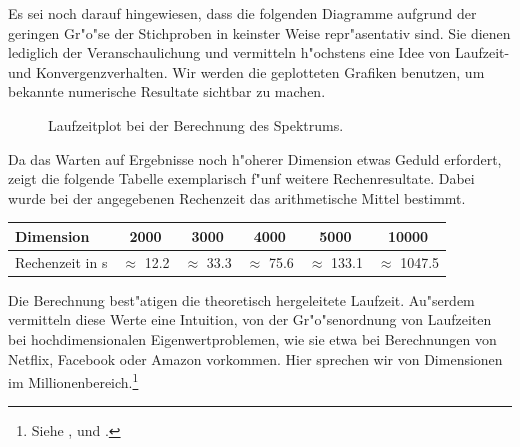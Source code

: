 Es sei noch darauf hingewiesen, dass die folgenden Diagramme aufgrund der geringen Gr"o"se der Stichproben in keinster Weise repr"asentativ sind. Sie dienen lediglich der Veranschaulichung und vermitteln h"ochstens eine Idee von Laufzeit- und Konvergenzverhalten. Wir werden die geplotteten Grafiken benutzen, um bekannte numerische Resultate sichtbar zu machen.

\newpage

\begin{figure}[h!]
\centering


\caption{Laufzeitplot bei der Berechnung des Spektrums.}\label{fig:chap5:laufzeit}
\end{figure}

Da das Warten auf Ergebnisse noch h"oherer Dimension etwas Geduld erfordert, zeigt die folgende Tabelle exemplarisch f"unf weitere Rechenresultate. Dabei wurde bei der angegebenen Rechenzeit das arithmetische Mittel bestimmt.

\begin{center}
\begin{tabular}{lccccc}
Dimension & 2000 & 3000 & 4000 & 5000 & 10000 \\
\hline
Rechenzeit in s & $\approx$ 12.2 & $\approx$ 33.3 & $\approx$ 75.6 & $\approx$ 133.1 & $\approx$ 1047.5
\end{tabular}
\end{center}

Die Berechnung best"atigen die theoretisch hergeleitete Laufzeit.
Au"serdem vermitteln diese Werte eine Intuition, von der Gr"o"senordnung von Laufzeiten bei hochdimensionalen Eigenwertproblemen, wie sie etwa bei Berechnungen von Netflix, Facebook oder Amazon vorkommen. Hier sprechen wir von Dimensionen im Millionenbereich.\footnote{Siehe \cite{facebook}, \cite{amazon} und \cite{netflix}.}\\

